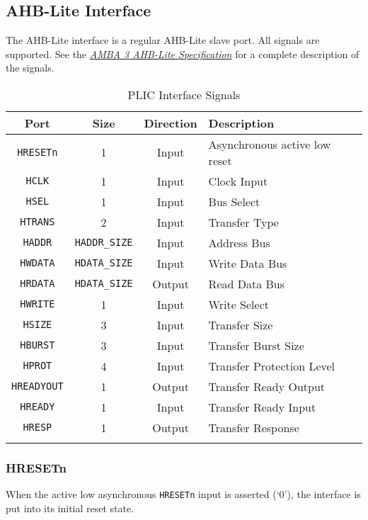 \subsection{AHB-Lite Interface}

The AHB-Lite interface is a regular AHB-Lite slave port. All signals are
supported. See the
\emph{\href{https://www.arm.com/products/system-ip/amba-specifications}{AMBA
3 AHB-Lite Specification}} for a complete description of the signals.

\begin{longtable}[c]{@{\extracolsep{\fill}}cccl@{}}	
		\toprule 
		\textbf{Port} & \textbf{Size} & \textbf{Direction} & \textbf{Description}\\
		\midrule
		\endhead 
		\texttt{HRESETn} & 1 & Input & Asynchronous active low reset\\
		\texttt{HCLK} & 1 & Input & Clock Input\\
		\texttt{HSEL} & 1 & Input & Bus Select\\
		\texttt{HTRANS} & 2 & Input & Transfer Type\\
		\texttt{HADDR} & \texttt{HADDR\_SIZE} & Input & Address Bus\\
		\texttt{HWDATA} & \texttt{HDATA\_SIZE} & Input & Write Data Bus\\
		\texttt{HRDATA} & \texttt{HDATA\_SIZE} & Output & Read Data Bus\\
		\texttt{HWRITE} & 1 & Input & Write Select\\
		\texttt{HSIZE} & 3 & Input & Transfer Size\\
		\texttt{HBURST} & 3 & Input & Transfer Burst Size\\
		\texttt{HPROT} & 4 & Input & Transfer Protection Level\\
		\texttt{HREADYOUT} & 1 & Output & Transfer Ready Output\\
		\texttt{HREADY} & 1 & Input & Transfer Ready Input\\
		\texttt{HRESP} & 1 & Output & Transfer Response\\
		\bottomrule 	
	\caption{PLIC Interface Signals}
	\label{tab:AHBIF}
\end{longtable}

\subsubsection{HRESETn}

When the active low asynchronous \texttt{HRESETn} input is asserted
(`0'), the interface is put into its initial reset state.

